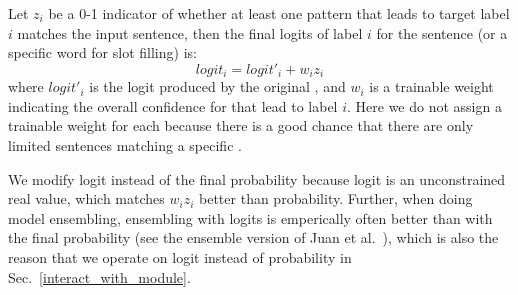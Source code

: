 Let $z_i$ be a 0-1 indicator of whether at least one \RE pattern that leads to target label $i$ matches the input sentence, then the final logits of label $i$ for the sentence (or a specific word for slot filling) is:
\begin{equation}
logit_i = logit'_i + w_i z_i
\end{equation}
where $logit'_i$ is the logit produced by the original \NN, and $w_i$ is a trainable weight indicating the overall confidence for \REs that lead to label $i$.
Here we do not assign a trainable weight for each \RE because there is a good chance that there are only limited sentences matching a specific \RE.

We modify logit instead of the final probability because logit is an unconstrained real value, which matches $w_i z_i$ better than probability.
Further, when doing model ensembling,
ensembling with logits is emperically often better than with the final probability (see the ensemble version of Juan et al.~), which is also the reason that we operate on logit instead of probability in Sec.~\ref{interact_with_module}.
